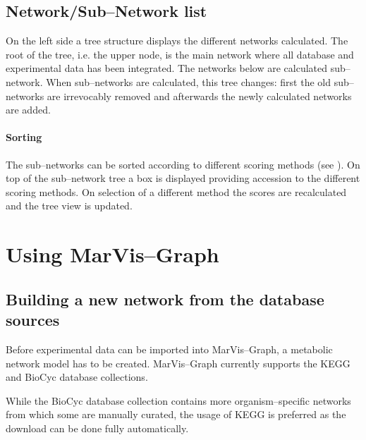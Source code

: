 \documentclass[titlepage,a4paper,twoside]{article}
\newcommand{\mg}{MarVis--Graph\xspace}
\newcommand{\pref}[1]{\prettyref{#1}}
\begin{document}
\subsection{Network/Sub--Network list}

On the left side a tree structure displays the different networks calculated.
The root of the tree, i.e. the upper node, is the main network where all
database and experimental data has been integrated. The networks below are
calculated sub--network. When sub--networks are calculated, this tree changes:
first the old sub--networks are irrevocably removed and afterwards the newly
calculated networks are added.

\paragraph{Sorting} The sub--networks can be sorted according to different
scoring methods (see \pref{sssec:scoring}). On top of the sub--network tree a
box is displayed providing accession to the different scoring methods. On
selection of a different method the scores are recalculated and the tree view
is updated.

\section{Using \mg}

\subsection{Building a new network from the database sources}

Before experimental data can be imported into \mg, a metabolic network model
has to be created. \mg currently supports the KEGG and BioCyc database
collections.

While the BioCyc database collection contains more organism--specific networks
from which some are manually curated, the usage of KEGG is preferred as the
download can be done fully automatically.
\end{document}
